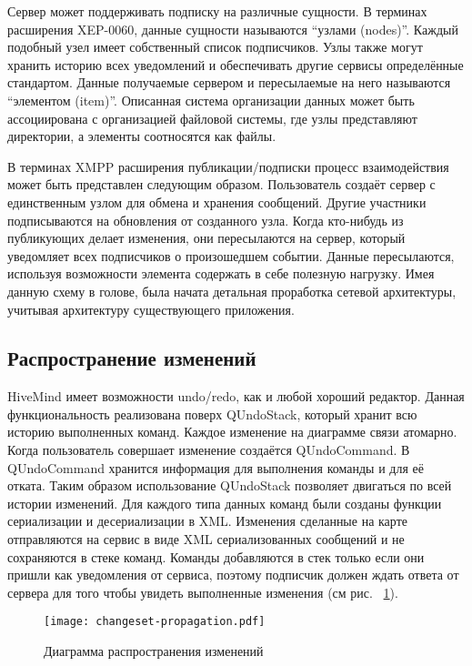 Сервер может поддерживать подписку на различные сущности. В терминах расширения
XEP-0060, данные сущности называются ``узлами (nodes)''. Каждый подобный узел
имеет собственный список подписчиков. Узлы также могут хранить историю всех
уведомлений и обеспечивать другие сервисы определённые стандартом. Данные
получаемые сервером и пересылаемые на него называются ``элементом (item)''.
Описанная система организации данных может быть ассоциирована с организацией
файловой системы, где узлы представляют директории, а элементы соотносятся как
файлы.

В терминах XMPP расширения публикации/подписки процесс взаимодействия может быть
представлен следующим образом. Пользователь создаёт сервер с единственным узлом
для обмена и хранения сообщений. Другие участники подписываются на обновления от
созданного узла. Когда кто-нибудь из публикующих делает изменения, они
пересылаются на сервер, который уведомляет всех подписчиков о произошедшем
событии. Данные пересылаются, используя возможности элемента содержать в себе
полезную нагрузку. Имея данную схему в голове, была начата детальная проработка
сетевой архитектуры, учитывая архитектуру существующего приложения.

\subsection{Распространение изменений}
\label{sec:changeset_propagation}
HiveMind имеет возможности undo/redo, как и любой хороший редактор. Данная
функциональность реализована поверх QUndoStack, который хранит всю историю
выполненных команд. Каждое изменение на диаграмме связи атомарно. Когда
пользователь совершает изменение создаётся QUndoCommand. В QUndoCommand хранится
информация для выполнения команды и для её отката. Таким образом использование
QUndoStack позволяет двигаться по всей истории изменений. Для каждого типа
данных команд были созданы функции сериализации и десериализации в XML.
Изменения сделанные на карте отправляются на сервис в виде XML сериализованных
сообщений и не сохраняются в стеке команд. Команды добавляются в стек только
если они пришли как уведомления от сервиса, поэтому подписчик должен ждать
ответа от сервера для того чтобы увидеть выполненные изменения (см рис.
~\ref{img:changeset_propagation}).

\begin{figure}
  \centering
  \texttt{[image: changeset-propagation.pdf]}
  \caption{Диаграмма распространения изменений}
  \label{img:changeset_propagation}
\end{figure}

